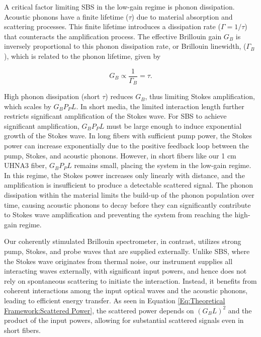 \documentclass[%
  reprint,
  superscriptaddress,
  amsmath,amssymb,
  aps,
  prapplied,
]{revtex4-2}
\begin{document}
A critical factor limiting SBS in the low-gain regime is phonon dissipation. Acoustic phonons have a finite lifetime ($\tau$) due to material absorption and scattering processes. This finite lifetime introduces a dissipation rate ($\Gamma = 1/\tau$) that counteracts the amplification process. The effective Brillouin gain $G_{B}$ is inversely proportional to this phonon dissipation rate, or Brillouin linewidth, ($\Gamma_{B}$), which is related to the phonon lifetime, given by

\begin{equation}
G_{B} \propto \frac{1}{\Gamma_{B}} = \tau.
\end{equation}

High phonon dissipation (short $\tau$) reduces $G_{B}$, thus limiting Stokes amplification, which scales by $G_{B}P_{P}L$. In short media, the limited interaction length further restricts significant amplification of the Stokes wave. For SBS to achieve significant amplification, $G_{B}P_{P}L$ must be large enough to induce exponential growth of the Stokes wave. In long fibers with sufficient pump power, the Stokes power can increase exponentially due to the positive feedback loop between the pump, Stokes, and acoustic phonons. However, in short fibers like our 1 cm UHNA3 fiber, $G_{B}P_{P}L$ remains small, placing the system in the low-gain regime. In this regime, the Stokes power increases only linearly with distance, and the amplification is insufficient to produce a detectable scattered signal. The phonon dissipation within the material limits the build-up of the phonon population over time, causing acoustic phonons to decay before they can significantly contribute to Stokes wave amplification and preventing the system from reaching the high-gain regime.

Our coherently stimulated Brillouin spectrometer, in contrast, utilizes strong pump, Stokes, and probe waves that are supplied externally. Unlike SBS, where the Stokes wave originates from thermal noise, our instrument supplies all interacting waves externally, with significant input powers, and hence does not rely on spontaneous scattering to initiate the interaction. Instead, it benefits from coherent interactions among the input optical waves and the acoustic phonons, leading to efficient energy transfer. As seen in Equation \ref{Eq:Theoretical Framework:Scattered Power}, the scattered power depends on $(G_{B} L)^{2}$ and the product of the input powers, allowing for substantial scattered signals even in short fibers.
\end{document}
